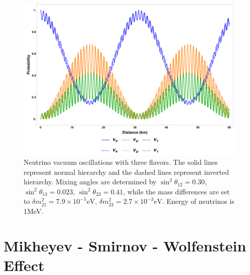 \begin{figure}
    \centering
    \includegraphics[width=\textwidth]{chapters/assets/basics/vacuum-oscillations-3-flavor.pdf}
    \caption{Neutrino vacuum oscillations with three flavors. The solid lines represent normal hierarchy and the dashed lines represent inverted hierarchy. Mixing angles are determined by $\sin^2\theta_{12}=0.30$, $\sin^2\theta_{13}=0.023$, $\sin^2\theta_{23}=0.41$, while the mass differences are set to $\delta m_{21}^2 = 7.9\times 10^{-5}\mathrm{eV}$, $\delta m^2_{23}=2.7\times 10^{-3}\mathrm{eV}$. Energy of neutrinos is 1MeV.}
    \label{chap:basics-section:neutrinos-fig:vacuum-3-flavor-osc}
\end{figure}





\section{\label{chap:basics-sec:msw}Mikheyev - Smirnov - Wolfenstein Effect}

